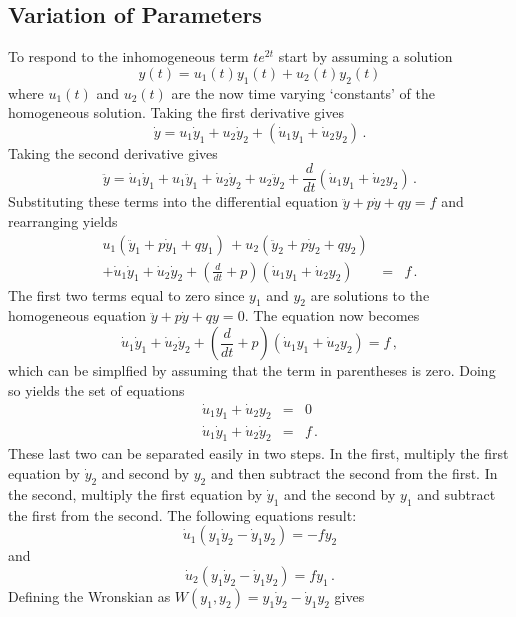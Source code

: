 \documentclass[10pt]{article}
\begin{document}
\subsection{Variation of Parameters}
To respond to the inhomogeneous term $t e^{2t}$ start by assuming a solution
\[
  y(t) = u_1(t) y_1(t) + u_2(t) y_2(t)
\]
where $u_1(t)$ and $u_2(t)$ are the now time varying `constants' of the 
homogeneous solution.  Taking the first derivative gives
\[
{\dot y} = u_1 {\dot y}_1 + u_2 {\dot y}_2 + \left( {\dot u}_1 y_1 + {\dot u}_2 y_2 \right) \, .
\]
Taking the second derivative gives 
\[
  {\ddot y} =   {\dot u_1} {\dot y}_1 + u_1 {\ddot y_1}
              + {\dot u_2} {\dot y}_2 + u_2 {\ddot y_2}
              + \frac{d}{dt} \left( {\dot u}_1 y_1 + {\dot u}_2 y_2 \right)\, .
\]
Substituting these terms into the differential equation ${\ddot y} + p {\dot y} + q y = f$ and rearranging yields
\begin{eqnarray}
      u_1 \left( {\ddot y_1} + p {\dot y_1} + q y_1 \right) \,
   +  u_2 \left( {\ddot y_2} + p {\dot y_2} + q y_2 \right) \, & & \\
   +  {\dot u}_1 {\dot y}_1 + {\dot u}_2 {\dot y}_2                        
   +  \left( \frac{d}{dt} + p \right) \left( {\dot u}_1 y_1 
   + {\dot u}_2 y_2 \right) & = &  f \, .
\end{eqnarray}
The first two terms equal to zero since $y_1$ and $y_2$ are solutions to the homogeneous 
equation ${\ddot y} + p {\dot y} + q y = 0$. 
The equation now becomes
\[
  {\dot u}_1 {\dot y}_1 + {\dot u}_2 {\dot y}_2 
+ \left( \frac{d}{dt} + p \right) 
  \left( {\dot u}_1 y_1  + {\dot u}_2 y_2 \right) = f \, ,
\]
which can be simplfied by assuming that the term in parentheses is zero.  
Doing so yields the set of equations
\begin{eqnarray}
  {\dot u}_1 y_1        + {\dot u}_2 y_2        & = & 0 \\
  {\dot u}_1 {\dot y}_1 + {\dot u}_2 {\dot y}_2 & = & f \, .
\end{eqnarray}
These last two can be separated easily in two steps.  In the first, multiply 
the first equation by ${\dot y}_2$ and second by $y_2$ and then
subtract the second from the first.  In the second, multiply the first equation
by ${\dot y}_1$ and the second by $y_1$ and subtract the first from the second.
The following equations result:
\[
  {\dot u}_1 \left( y_1 {\dot y}_2 - {\dot y}_1 y_2 \right) = - f y_2
\]
and
\[
  {\dot u}_2 \left( y_1 {\dot y}_2 - {\dot y}_1 y_2 \right) =   f y_1 \, .
\]
Defining the Wronskian as $W(y_1,y_2) = y_1 {\dot y}_2 - {\dot y}_1 y_2$ gives
\end{document}
